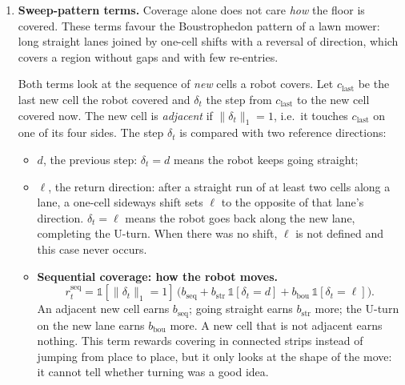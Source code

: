 \documentclass[11pt,a4paper]{article}
\begin{document}
\begin{enumerate}[label=\textbf{\arabic*.},resume]
\item \textbf{Sweep-pattern terms.}
Coverage alone does not care \emph{how} the floor is covered. These terms
favour the Boustrophedon pattern of a lawn mower: long straight lanes joined
by one-cell shifts with a reversal of direction, which covers a region
without gaps and with few re-entries.

Both terms look at the sequence of \emph{new} cells a robot covers. Let
$c_{\text{last}}$ be the last new cell the robot covered and $\delta_t$ the
step from $c_{\text{last}}$ to the new cell covered now. The new cell is
\emph{adjacent} if $\|\delta_t\|_1 = 1$, i.e.\ it touches $c_{\text{last}}$
on one of its four sides. The step $\delta_t$ is compared with two reference
directions:
\begin{itemize}
  \item $d$, the previous step: $\delta_t = d$ means the robot keeps going
        straight;
  \item $\ell$, the return direction: after a straight run of at least two
        cells along a lane, a one-cell sideways shift sets $\ell$ to the
        opposite of that lane's direction. $\delta_t = \ell$ means the robot
        goes back along the new lane, completing the U-turn. When there was
        no shift, $\ell$ is not defined and this case never occurs.
\end{itemize}

\begin{itemize}
 \item \textbf{Sequential coverage: how the robot moves.}
 \[
   r^{\mathrm{seq}}_t = \mathbb{1}[\|\delta_t\|_1 = 1]\,
   \big(b_{\mathrm{seq}} + b_{\mathrm{str}}\,\mathbb{1}[\delta_t = d]
         + b_{\mathrm{bou}}\,\mathbb{1}[\delta_t = \ell]\big).
 \]
 An adjacent new cell earns $b_{\mathrm{seq}}$; going straight earns
 $b_{\mathrm{str}}$ more; the U-turn on the new lane earns $b_{\mathrm{bou}}$
 more. A new cell that is not adjacent earns nothing. This term rewards
 covering in connected strips instead of jumping from place to place, but it
 only looks at the shape of the move: it cannot tell whether turning was a
 good idea.


\end{itemize}
\end{enumerate}
\end{document}
